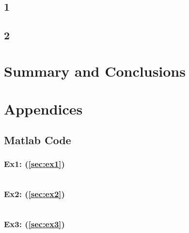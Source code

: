 \documentclass[12pt]{article}
\begin{document}
\subsection{1}
\label{sec:Q4_1}
\subsection{2}
\label{sec:Q4_2}
\pagebreak

\section{Summary and Conclusions}\label{sec:summary}


\pagebreak




\pagebreak

\appendix
\section*{Appendices}\label{appendix:main}
\renewcommand{\thesubsection}{\Alph{subsection}}

\subsection{Matlab Code}
\subsubsection{Ex1: (\ref{sec:ex1})}\label{appendix:ex1}
\inputminted{matlab}{matlab/ex1.m}

\subsubsection{Ex2: (\ref{sec:ex2})}\label{appendix:ex2}
\inputminted{matlab}{matlab/ex2.m}

\subsubsection{Ex3: (\ref{sec:ex3})}\label{appendix:ex3}
\inputminted{matlab}{matlab/ex3.m}
\end{document}
